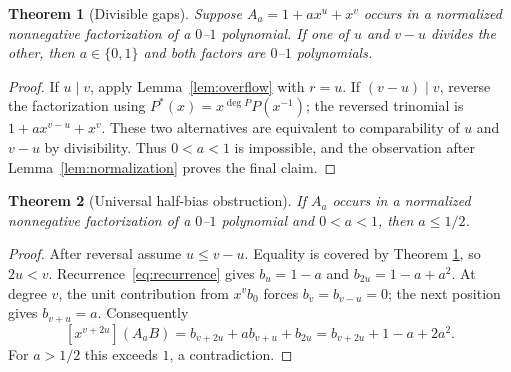\documentclass[11pt]{article}
\newtheorem{theorem}{Theorem}[section]
\theoremstyle{remark}
\numberwithin{equation}{section}
\begin{document}
\begin{theorem}[Divisible gaps]\label{thm:divisible}
Suppose $A_a=1+a x^u+x^v$ occurs in a normalized nonnegative factorization of
a $0$--$1$ polynomial.  If one of $u$ and $v-u$ divides the other, then
$a\in\{0,1\}$ and both factors are $0$--$1$ polynomials.
\end{theorem}
\begin{proof}
If $u\mid v$, apply Lemma~\ref{lem:overflow} with $r=u$.  If $(v-u)\mid v$,
reverse the factorization using $P^*(x)=x^{\deg P}P(x^{-1})$; the reversed
trinomial is $1+a x^{v-u}+x^v$.  These two alternatives are equivalent to
comparability of $u$ and $v-u$ by divisibility.  Thus $0<a<1$ is impossible,
and the observation after Lemma~\ref{lem:normalization} proves the final claim.
\end{proof}

\begin{theorem}[Universal half-bias obstruction]\label{thm:half}
If $A_a$ occurs in a normalized nonnegative factorization of a $0$--$1$
polynomial and $0<a<1$, then $a\le1/2$.
\end{theorem}
\begin{proof}
After reversal assume $u\le v-u$.  Equality is covered by Theorem
\ref{thm:divisible}, so $2u<v$.  Recurrence~\eqref{eq:recurrence} gives
$b_u=1-a$ and $b_{2u}=1-a+a^2$.  At degree $v$, the unit contribution from
$x^vb_0$ forces $b_v=b_{v-u}=0$; the next position gives $b_{v+u}=a$.
Consequently
\[
[x^{v+2u}](A_aB)=b_{v+2u}+a b_{v+u}+b_{2u}
=b_{v+2u}+1-a+2a^2.
\]
For $a>1/2$ this exceeds $1$, a contradiction.
\end{proof}
\end{document}
